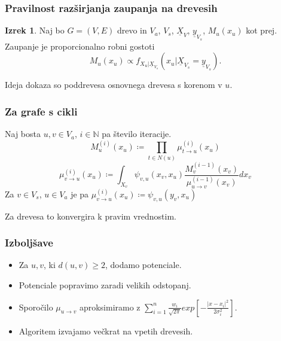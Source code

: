 \documentclass{beamer}
\renewcommand{\vec}{\underline}
\theoremstyle{definition}
\newtheorem{izrek}{Izrek}
\begin{document}
  \begin{frame}
    \frametitle{Pravilnost razširjanja zaupanja na drevesih}
    \begin{izrek}
      Naj bo $G = \left(V, E\right)$ drevo in $V_a$, $V_s$, $\vec{X}_V$,
      $\vec{y}_{V_s}$, $M_u\left(x_u\right)$ kot prej.
      Zaupanje je proporcionalno robni gostoti
      $$
      M_u\left(x_u\right) \propto f_{X_u | \vec{X}_{V_s}}\left(x_u | \vec{X}_{V_s} = \vec{y}_{V_s}\right).
      $$
    \end{izrek}
    Ideja dokaza so poddrevesa osnovnega drevesa s korenom v $u$.
  \end{frame}


  \begin{frame}
    \frametitle{Za grafe s cikli}
    Naj bosta $u,v \in V_a$, $i \in \mathbb{N}$ pa število iteracije.
    $$
    M_u^{\left(i\right)}\left(x_u\right) \coloneqq
    \prod_{t \in N\left(u\right)}\mu^{\left(i\right)}_{t \to u}\left(x_u\right)
    $$
    $$
    \mu_{v \to u}^{\left(i\right)}\left(x_u\right) \coloneqq
    \int_{X_v} \psi_{v,u}\left(x_v,x_u\right)
    \frac{
      M_v^{\left(i-1\right)}\left(x_v\right)}{
      \mu_{u \to v}^{\left(i-1\right)}\left(x_v\right)
    }dx_v
    $$
    Za $v \in V_s$, $u \in V_a$ je pa
    $\mu_{v \to u}^{\left(i\right)}\left(x_u\right) \coloneqq \psi_{v,u}\left(y_v, x_u\right)$

    Za drevesa to konvergira k pravim vrednostim.
  \end{frame}


  \begin{frame}
    \frametitle{Izboljšave}
    \begin{itemize}
      \item Za $u,v$, ki $d\left(u,v\right) \geq 2$, dodamo potenciale.
      \item Potenciale popravimo zaradi velikih odstopanj.
      \item Sporočilo $\mu_{u \to v}$ aproksimiramo z
        $\sum_{i=1}^{n}\frac{w_i}{\sqrt{2\pi}} exp\left[-\frac{\left|x-x_i\right|^2}{2\sigma_i^2}\right]$.
      \item Algoritem izvajamo večkrat na vpetih drevesih.
    \end{itemize}
  \end{frame}
\end{document}
